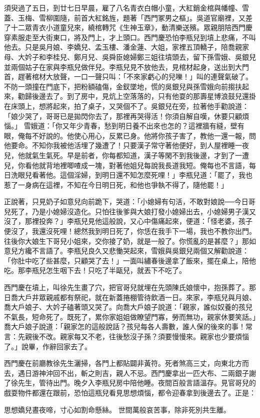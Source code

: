 \begin{showcontents}{}
須臾過了五日，到廿七日早晨，雇了八名青衣白帽小童，大紅銷金棺與幡幢、雪蓋、玉梅、雪柳圍隨，前首大紅銘旌，題著「西門冢男之樞」。吳道官廟裡，又差了十二眾青衣小道童兒來，繞棺轉咒《生神玉章》，動清樂送殯。眾親朋陪西門慶穿素服走至大街東口，將及門上，才上頭口。西門慶恐怕李瓶兒到墳上悲痛，不叫他去。只是吳月娘、李嬌兒、孟玉樓、潘金蓮、大姐，家裡五頂轎子，陪喬親家母、大妗子和李桂兒、鄭月兒、吳舜臣媳婦鄭三姐往墳頭去，留下孫雪娥、吳銀兒並兩個姑子在家與李瓶兒做伴兒。李瓶兒見不放他去，見棺材起身，送出到大門首，趕著棺材大放聲，一口一聲只叫：「不來家虧心的兒嚛！」叫的連聲氣破了。不防一頭撞在門底下，把粉額磕傷，金釵墜地，慌的吳銀兒與孫雪娥向前搊扶起來，勸歸後邊去了。到了房中，見炕上空落落的，只有他耍的那壽星博浪鼓兒還掛在床頭上，想將起來，拍了桌子，又哭個不了。吳銀兒在旁，拉著他手勸說道：「娘少哭了，哥哥已是拋閃你去了，那裡再哭得活！你須自解自嘆，休要只顧煩惱。」 雪娥道：「你又年少青春，愁到明日養不出來也怎的？這裡牆有縫，壁有眼，俺每不好說的。他使心用心，反累已身。他將你孩子害了，教他一還一報，問他要命。不知你我被他活埋了幾遭了！只要漢子常守著他便好，到人屋裡睡一夜兒，他就氣生氣死。早是前者，你每都知道，漢子等閑不到我後邊，才到了一遭兒，你看他就背地裡唧喳成一塊，對著他姐兒每說我長道我短。俺每也不言語，每日洗眼兒看著他。這個淫婦，到明日還不知怎麼死哩！」李瓶兒道：「罷了，我也惹了一身病在這裡，不知在今日明日死，和他也爭執不得了，隨他罷！」

正說著，只見奶子如意兒向前跪下，哭道：「小媳婦有句活，不敢對娘說──今日哥兒死了，乃是小媳婦沒造化。只怕往後爹與大娘打發小媳婦出去，小媳婦男子漢又沒了，那裡投奔？」李瓶兒見他這般說，又心中傷痛起來，便道：「怪老婆，孩子便沒了，我還沒死哩！總然我到明日死了，你恁在我手下一場，我也不教你出門。往後你大娘生下哥兒小姐來，交你接了奶，就是一般了。你慌亂的是甚麼？」那如意兒方纔不言語了。李瓶兒良久又悲慟哭起來，雪娥與吳銀兒兩個又解勸說道：「你肚中吃了些甚麼，只顧哭了去！」一面叫繡春後邊拿了飯來，擺在桌上，陪他吃。那李瓶兒怎生咽下去！只吃了半甌兒，就丟下不吃了。

西門慶在墳上，叫徐先生畫了穴，把官哥兒就埋在先頭陳氏娘懷中，抱孫葬了。那日喬大戶井眾親戚都有祭祀，就在新蓋捲棚管待飲酒一日。來家，李瓶兒與月娘、喬大戶娘子、大妗子磕著頭又哭了。向喬大戶娘子說道：「親家，誰似奴養的孩兒不氣長，短命死了。既死了，累你家姐姐做瞭望門寡，勞而無功，親家休要笑話。」喬大戶娘子說道：「親家怎的這般說話？孩兒每各人壽數，誰人保的後來的事！常言：先親後不改。親家每又不老，往後愁沒子孫？須要慢慢來。親家也少要煩惱了。」說畢，作辭回家去了。

西門慶在前廳教徐先生灑掃，各門上都貼闢非黃符。死者煞高三丈，向東北方而去，遇日游神沖回不出，斬之則吉，親人不忌。西門慶拿出一匹大布、二兩銀子謝了徐先生，管待出門。晚夕入李瓶兒房中陪他睡。夜間百般言語溫存。見官哥兒的戲耍物件都還在跟前，恐怕這瓶兒看見思想煩惱，都令迎春拿到後邊去了。正是：

思想嬌兒晝夜啼，寸心如割命懸絲。
世間萬般哀苦事，除非死別共生離。



\end{showcontents}

